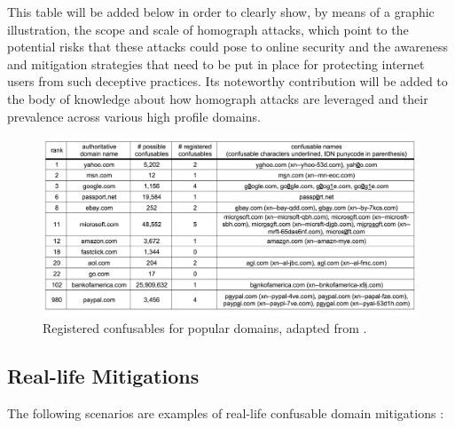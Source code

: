 This table will be added below in order to clearly show, by means of a graphic illustration, the scope and scale of homograph attacks, which point to the potential risks that these attacks could pose to online security and the awareness and mitigation strategies that need to be put in place for protecting internet users from such deceptive practices. Its noteworthy contribution will be added to the body of knowledge about how homograph attacks are leveraged and their prevalence across various high profile domains.



\captionsetup{font= footnotesize}
\begin{figure}[H]
    \centering
    \includegraphics[width=1\linewidth]{evaluation/confusable.png}
    
    \caption{Registered confusables for popular domains, adapted from \cite{HomographAttacks}.}
    \label{fig:figureAlot1}
\end{figure}

\subsection{ Real-life Mitigations}

The following scenarios are examples of real-life confusable domain mitigations :

